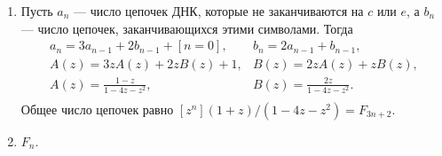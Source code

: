 \documentclass[14pt]{book}
\begin{document}
\begin{enumerate}
\item Пусть $a_n$ --- число цепочек ДНК, которые не заканчиваются на $c$ или $e$, а $b_n$ --- число
      цепочек, заканчивающихся этими символами. Тогда
      $$
      \begin{array}{ll}
      a_n = 3a_{n-1}+2b_{n-1}+[n=0], & b_n = 2a_{n-1} + b_{n-1}, \\
      A(z) = 3zA(z) + 2zB(z) + 1,    & B(z) = 2zA(z) + zB(z), \\
      A(z) = \frac{1-z}{1-4z-z^2},   & B(z) = \frac{2z}{1-4z-z^2}. \\
      \end{array}
      $$
      Общее число цепочек равно $[z^n](1+z)/(1-4z-z^2) = F_{3n+2}$.

\item $F_n$.

\end{enumerate}
\end{document}
